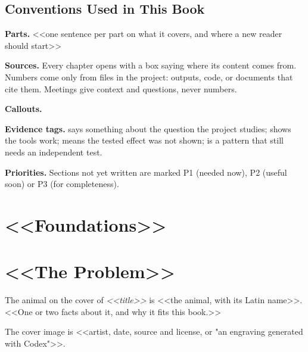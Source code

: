 \documentclass[10pt,twoside,openright]{book}
\begin{document}
\frontmatter
{}
\halftitlepage
{}
\tableofcontents

\chapter{Conventions Used in This Book}

\textbf{Parts.} <<one sentence per part on what it covers, and where a new reader
should start>>

\textbf{Sources.} Every chapter opens with a box saying where its content comes
from. Numbers come only from files in the project: outputs, code, or documents
that cite them. Meetings give context and questions, never numbers.

\textbf{Callouts.}

\textbf{Evidence tags.}  says something about the question the
project studies;  shows the tools work;  means the
tested effect was not shown;  is a pattern that still needs an
independent test.

\textbf{Priorities.} Sections not yet written are marked P1 (needed now), P2
(useful soon) or P3 (for completeness).

\mainmatter
\part{<<Foundations>>}


\part{<<The Problem>>}


\appendix


\backmatter
\printindex

\begin{colophon}
The animal on the cover of \emph{<<title>>} is <<the animal, with its Latin
name>>. <<One or two facts about it, and why it fits this book.>>

The cover image is <<artist, date, source and license, or "an engraving
generated with Codex">>.
\end{colophon}
\end{document}

